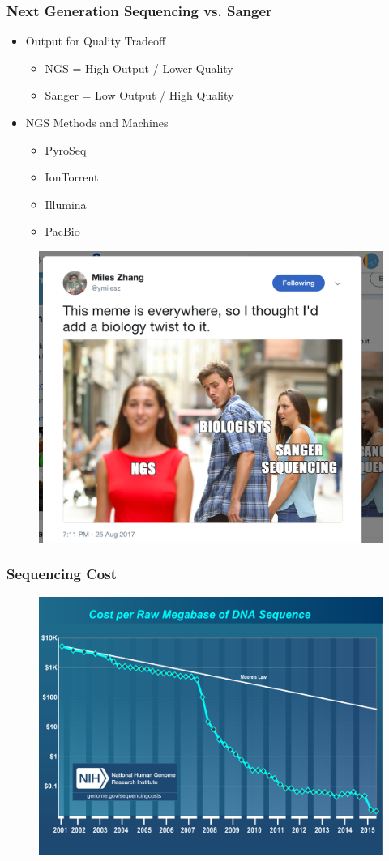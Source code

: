\documentclass[14pt]{beamer}
\begin{document}
\begin{frame}
\frametitle{Next Generation Sequencing vs. Sanger}
\begin{itemize}
	\item<1-> Output for Quality Tradeoff
	\begin{itemize}
		\item NGS = High Output / Lower Quality
		\item Sanger = Low Output / High Quality
	\end{itemize}
	\item<2-> NGS Methods and Machines
	\begin{itemize}
		\item<3-> PyroSeq
		\item IonTorrent
		\item Illumina
		\item PacBio
	\end{itemize}
\end{itemize}
\end{frame}
\begin{frame}
\begin{figure}
\includegraphics[width=0.8\linewidth]{images_20170829_NGS_meme.png}
\end{figure}
\end{frame}
\begin{frame}
\frametitle{Sequencing Cost}
\begin{figure}
\includegraphics[width=0.8\linewidth]{images_20170829_NGS_cost.jpg}
\end{figure}
\end{frame}
\end{document}
